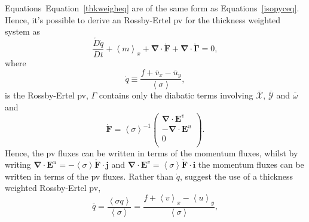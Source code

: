 \documentclass[10pt,a4paper]{report}
\newcommand*\thkmean[1]{\overline{#1}}
\newcommand*\nthkmean[1]{\left\langle{#1}\right\rangle}
\newcommand*\spec[1]{\mathring{#1}}
\newcommand*\equref[1]{Equation~\eqref{#1}}
\begin{document}
                      Equations~\equref{thkweigheq} are of the same form as Equations~\ref{isopyceq}.
                      Hence, it's possible to derive an
                      Rossby-Ertel \gls{pv} for the thickness weighted system
                      as
                      \begin{equation}
                      \frac{\spec{D} \spec{q}}{D t} + \nthkmean{m}_{x} 
                      +\boldsymbol{\nabla}\cdot\spec{\boldsymbol{F}}
                      +\boldsymbol{\nabla}\cdot\spec{\boldsymbol{\Gamma}}=0,
                      \end{equation} 
                      where
                      \begin{equation}
                      \spec{q}\equiv\frac{f+\thkmean{v}_{x}-\thkmean{u}_{y}}{\nthkmean{\sigma}},
                      \end{equation}
                      is the Rossby-Ertel \gls{pv}, $\Gamma$ contains only the diabatic terms involving $\thkmean{\mathcal{X}} $, $\thkmean{\mathcal{Y}} $ and $\thkmean{\omega} $ and 
                      \begin{equation}
                      \spec{\boldsymbol{F}}=\nthkmean{\sigma}^{-1}\left(
                      \begin{array}{c}
                      \boldsymbol{\nabla}\cdot\boldsymbol{E}^v \\
                      -\boldsymbol{\nabla}\cdot\boldsymbol{E}^u\\
                      0 \\
                      \end{array}\right).
                      \end{equation}
                      Hence, the \gls{pv} fluxes can be written in terms of
                      the momentum fluxes, whilst by writing ${\boldsymbol{\nabla}\cdot\boldsymbol{E}^u = -\nthkmean{\sigma} \spec{\boldsymbol{F}}\cdot\boldsymbol{j}}$ and
                      ${\boldsymbol{\nabla}\cdot\boldsymbol{E}^v = \nthkmean{\sigma} \spec{\boldsymbol{F}}\cdot\boldsymbol{i}}$ the momentum fluxes
                      can be written in terms of the \gls{pv} fluxes.
                      Rather than $\spec{q}$, \cite{greatbatch1998exploring} suggest
                      the use of a thickness weighted Rossby-Ertel \gls{pv},
                      \begin{equation}
                      \thkmean{q}=\frac{\nthkmean{\sigma q}}{\nthkmean{\sigma}}=\frac{f+\nthkmean{v}_{x}-\nthkmean{u}_{y}}{\nthkmean{\sigma}},
                      \end{equation}
\end{document}
